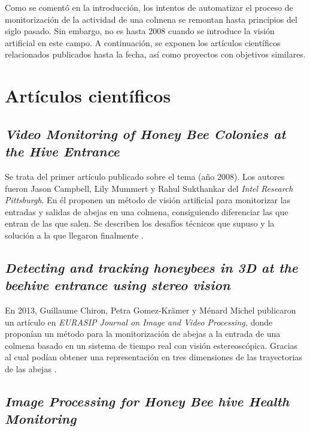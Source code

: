 
Como se comentó en la introducción, los intentos de automatizar el
proceso de monitorización de la actividad de una colmena se remontan
hasta principios del siglo pasado. Sin embargo, no es hasta 2008 cuando
se introduce la visión artificial en este campo. A continuación, se
exponen los artículos científicos relacionados publicados hasta la
fecha, así como proyectos con objetivos similares.

\section{Artículos científicos}\label{artuxedculos-cientuxedficos}

\subsection{\emph{Video Monitoring of Honey Bee Colonies at the Hive
Entrance}}\label{video-monitoring-of-honey-bee-colonies-at-the-hive-entrance}

Se trata del primer artículo publicado sobre el tema (año 2008). Los
autores fueron Jason Campbell, Lily Mummert y Rahul Sukthankar del
\emph{Intel Research Pittsburgh}. En él proponen un método de visión
artificial para monitorizar las entradas y salidas de abejas en una
colmena, consiguiendo diferenciar las que entran de las que salen. Se
describen los desafíos técnicos que supuso y la solución a la que
llegaron finalmente \citep{art:campbell2008}.

\subsection{\emph{Detecting and tracking honeybees in 3D at the beehive
entrance using stereo
vision}}\label{detecting-and-tracking-honeybees-in-3d-at-the-beehive-entrance-using-stereo-vision}

En 2013, Guillaume Chiron, Petra Gomez-Krämer y Ménard Michel publicaron
un artículo en \emph{EURASIP Journal on Image and Video Processing,}
donde proponían un método para la monitorización de abejas a la entrada
de una colmena basado en un sistema de tiempo real con visión
estereoscópica. Gracias al cual podían obtener una representación en
tres dimensiones de las trayectorias de las abejas
\citep{art:chiron2013}.

\subsection{\emph{Image Processing for Honey Bee hive Health
Monitoring}}\label{image-processing-for-honey-bee-hive-health-monitoring}

